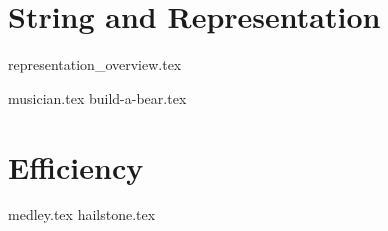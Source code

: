 \documentclass{exam}
\begin{document}
\section{String and Representation}
{representation_overview.tex}
\begin{questions}
    \newpage
    {musician.tex}
    \newpage
    {build-a-bear.tex}
\end{questions}

\section{Efficiency}
\begin{questions}
    \newpage
    {medley.tex}
    \newpage
    {hailstone.tex}
\end{questions}
\end{document}
